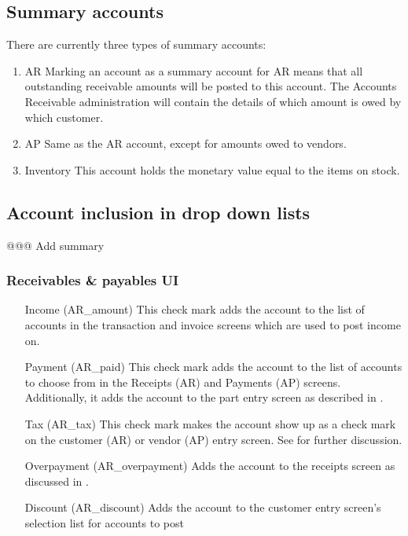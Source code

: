 \subsection{Summary accounts}
\label{subsec-summary-accounts}

There are currently three types of summary accounts:

\begin{enumerate}
\item AR Marking an account as a summary account for AR means that all outstanding
   receivable amounts will be posted to this account. The Accounts Receivable administration
   will contain the details of which amount is owed by which customer.
\item AP Same as the AR account, except for amounts owed to vendors.
\item Inventory This account holds the monetary value equal to the items on stock.
\end{enumerate}

\subsection{Account inclusion in drop down lists}
\label{subsec-account-links}
@@@ Add summary

\subsubsection{Receivables \& payables UI}
\label{subsec-AR-AP-checkmarks}

\begin{itemize}
\item[Income (AR\_amount)] This check mark adds the account to the list of accounts
   in the transaction and invoice screens which are used to post income on.
\item[Payment (AR\_paid)] This check mark adds the account to the list of accounts
   to choose from in the Receipts (AR) and Payments (AP) screens. Additionally, it
   adds the account to the part entry screen as described in .
\item[Tax (AR\_tax)] This check mark makes the account show up as a check mark on the
   customer (AR) or vendor (AP) entry screen. See  for further discussion.
\item[Overpayment (AR\_overpayment)] Adds the account to the receipts screen as discussed
   in .
\item[Discount (AR\_discount)] Adds the account to the customer entry screen's selection
   list for accounts to post 
\end{itemize}

